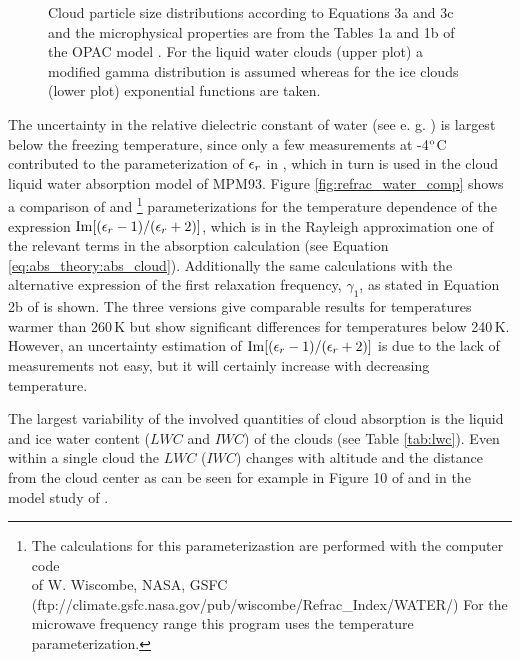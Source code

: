 \begin{figure}
\begin{center}
  \end{center}
  \caption[Cloud particle size distributions.]{Cloud particle size distributions according to 
    Equations 3a and 3c and the microphysical properties are from the 
    Tables 1a and 1b of the OPAC model \citep{hess:98}. 
    For the liquid water clouds (upper plot) a modified gamma 
    distribution is assumed whereas for the ice clouds (lower plot) 
    exponential functions are taken.}
  \label{fig:cloud_part_dist}
\end{figure}

The uncertainty in the relative dielectric constant of water 
(see e. g. \citet{liptonetal:99}) is largest below the freezing 
temperature, since only a few measurements at -4$^{\rm o}$C 
contributed to the parameterization of $\epsilon_r$ in \citet{liebeetal:91}, 
which in turn is used in the cloud liquid water absorption model of MPM93. 
Figure \ref{fig:refrac_water_comp} shows a comparison of 
\citet{liebeetal:91} and \citet{ray:72}\footnote{{The calculations
  for this parameterizastion are performed with the computer code}\\{
   of W. Wiscombe, NASA, GSFC}\\
  (ftp://climate.gsfc.nasa.gov/pub/wiscombe/Refrac\_Index/WATER/)
  For the microwave frequency range this program uses the
  \citet{ray:72} temperature parameterization.} parameterizations 
for the temperature dependence of the expression
$\mathrm{Im}{[(\epsilon_r-1)/(\epsilon_r+2)]}$, which is in the Rayleigh approximation 
one of the relevant terms in the absorption calculation (see 
Equation \ref{eq:abs_theory:abs_cloud}). Additionally the same calculations with 
the alternative expression of the first  relaxation frequency, 
$\gamma_1$, as stated in Equation 2b of \citet{liebeetal:91} is shown. 
The three versions give comparable results for temperatures warmer 
than 260\,K but show significant  differences for temperatures below 
240\,K. However, an uncertainty estimation of $\mathrm{Im}{[(\epsilon_r-1)/(\epsilon_r+2)]}$ 
is due to the lack of measurements not easy, but it will certainly
increase with decreasing temperature.

The largest variability of the involved quantities of cloud absorption
is the liquid and ice water content ($LWC$ and $IWC$) of the clouds 
(see Table \ref{tab:lwc}). Even within a single cloud the $LWC$ ($IWC$) changes
with altitude and the distance from the cloud center as can be seen for
example in Figure 10 of \citet{ludlammason:57} and in the model study
of \citet{costaetal:00}.



